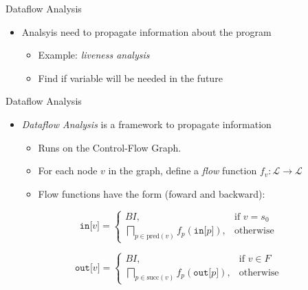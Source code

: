 
\begin{frame}{Dataflow Analysis}
\begin{itemize}
    \item Analsyis need to propagate information about the program
    \begin{itemize}
        \item Example: \textit{liveness analysis}
        \item Find if variable will be needed in the future
    \end{itemize}
\end{itemize}
\end{frame}


\begin{frame}{Dataflow Analysis}
\begin{itemize}
    \item \textit{Dataflow Analysis} is a framework to propagate information
    \begin{itemize}
        \item Runs on the Control-Flow Graph.
        \item For each node $v$ in the graph, define a \textit{flow} function
              $f_v : \mathcal{L} \longrightarrow \mathcal{L}$
        \item Flow functions have the form (foward and backward):
    \end{itemize}
\end{itemize}

\begin{equation}\label{eq:forward}
	\texttt{in[} v \texttt{]} = \begin{cases}
	  BI,& \text{if } v = s_0 \\
	  \bigsqcap_{p \in \text{pred}(v)}f_p(\texttt{in[}p\texttt{]}) ,& \text{otherwise}
	\end{cases}
\end{equation}

\begin{equation}\label{eq:backward}
	\texttt{out[} v \texttt{]} = \begin{cases}
	  BI,& \text{if } v \in F \\
	  \bigsqcap_{p \in \text{succ}(v)}f_p(\texttt{out[}p\texttt{]}) ,& \text{otherwise}
	\end{cases}
\end{equation}

\end{frame}

